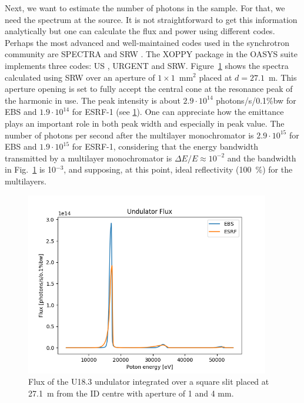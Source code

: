 \documentclass{iucr}              %
\begin{document}
Next, we want to estimate the number of photons in the sample. For that, we need the spectrum at the source. It is not straightforward to get this information analytically but one can calculate the flux and power using different codes. Perhaps the most advanced and well-maintained codes used in the synchrotron community are SPECTRA \cite{codeSPECTRA} and SRW \cite{codeSRW}. The XOPPY package in the OASYS suite implements three codes: US \cite{codeUS}, URGENT \cite{codeURGENT} and SRW. Figure~\ref{fig:FluxU18} shows the spectra calculated using SRW over an aperture of $1 \times 1$~mm$^2$ placed at $d=27.1$~m. This aperture opening is set to fully accept the central cone at the resonance peak of the harmonic in use.
The peak intensity is about  $2.9\cdot10^{14}$ photons/s/0.1{\%}bw for EBS and $1.9\cdot10^{14}$ for ESRF-1 (see \ref{fig:FluxU18}). One can appreciate how the emittance plays an important role in both peak width and especially in peak value. The number of photons per second after the multilayer monochromator is $2.9\cdot10^{15}$ for EBS and $1.9\cdot10^{15}$ for ESRF-1, considering that the energy bandwidth transmitted by a multilayer monochromator is $\Delta E/E \approx 10^{-2}$ and the bandwidth in Fig.~\ref{fig:FluxU18} is 10$^{-3}$, and supposing, at this point, ideal reflectivity (100~\%) for the multilayers. 

\begin{figure}\label{fig:FluxU18}
    \centering
    \includegraphics[width=0.95\textwidth]{GRAPHICS/fluxU18.png}
    \caption{Flux of the U18.3 undulator integrated over a square slit placed at 27.1~m from the ID centre with aperture of 1 and 4 mm.}
\end{figure}
\end{document}
